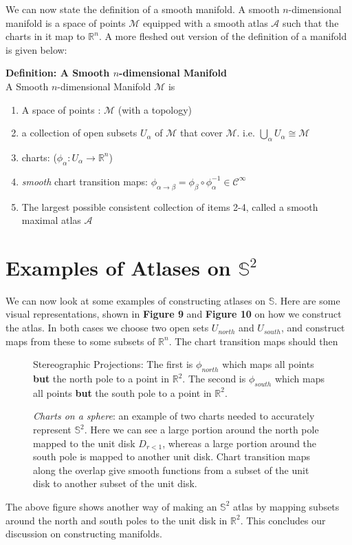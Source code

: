 \documentclass[10pt]{article}
\begin{document}
We can now state the definition of a smooth manifold. A smooth $n$-dimensional manifold is a space of points $\mathcal{M}$ equipped with a smooth atlas $\mathcal{A}$ such that the charts in it map to $\mathbb{R}^n$. A more fleshed out version of the definition of a manifold is given below:
\\
\begin{tcolorbox}
\textbf{Definition: A Smooth $n$-dimensional Manifold} \\

A Smooth $n$-dimensional Manifold $\mathcal{M}$ is 
\begin{enumerate}
    \item A space of points : $\mathcal{M}$ (with a topology)
    \item a collection of open subsets $U_{\alpha}$ of $\mathcal{M}$ that cover $\mathcal{M}$. i.e. $\bigcup_{\alpha} U_{\alpha} \cong \mathcal{M}$
    \item charts: ($\phi_{\alpha}:U_{\alpha} \rightarrow \mathbb{R}^n$)
    \item \textit{smooth} chart transition maps: $\phi_{\alpha\rightarrow \beta} = \phi_{\beta}\circ\phi_{\alpha}^{-1} \in \mathcal{C}^{\infty}$
    \item The largest possible consistent collection of items 2-4, called a smooth maximal atlas $\mathcal{A}$
\end{enumerate}

\end{tcolorbox}

\section{Examples of Atlases on $\mathbb{S}^2$}
We can now look at some examples of constructing atlases on $\mathbb{S}$. Here are some visual representations, shown in \textbf{Figure 9} and \textbf{Figure 10} on how we construct the atlas. In both cases we choose two open sets $U_{north}$ and $U_{south}$, and construct maps from these to some subsets of $\mathbb{R}^n$. The chart transition maps should then

\begin{figure}[h!]
\centering

\caption{Stereographic Projections: The first is $\phi_{north}$ which maps all points \textbf{but} the north pole to a point in $\mathbb{R}^2$. The second is $\phi_{south}$ which maps all points \textbf{but} the south pole to a point in $\mathbb{R}^2$.}

\end{figure}
\begin{figure}[h!]
\centering

\caption{\textit{Charts on a sphere}: an example of two charts needed to accurately represent $\mathbb{S}^2$. Here we can see a large portion around the north pole mapped to the unit disk $D_{r<1}$, whereas a large portion around the south pole is mapped to another unit disk. Chart transition maps along the overlap give smooth functions from a subset of the unit disk to another subset of the unit disk.  }
\label{fig:my_label 2}
\end{figure}


The above figure shows another way of making an $\mathbb{S}^2$ atlas by mapping subsets around the north and south poles to the unit disk in $\mathbb{R}^2$. This concludes our discussion on constructing manifolds.
\end{document}
